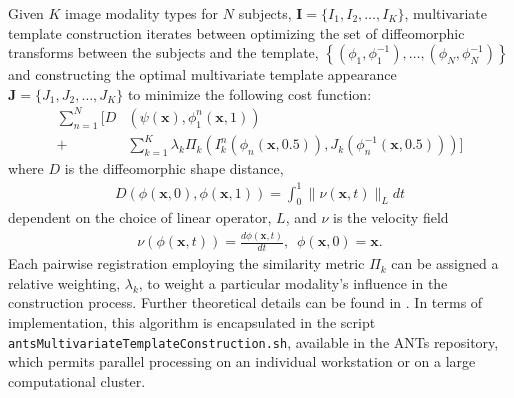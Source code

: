 \documentclass[final,5p,times,twocolumn]{elsarticle}
\begin{document}
Given $K$ image modality types for $N$ subjects,  
${\mathbf I} = \{I_1,I_2,\ldots, I_K\}$, multivariate 
template construction iterates between optimizing the set 
of diffeomorphic transforms between the subjects and the 
template, 
$\left\{\left(\phi_1,\phi_1^{-1}\right),\ldots,\left(\phi_N,\phi_N^{-1}\right)\right\}$ 
and constructing the 
optimal multivariate template appearance 
$\mathbf{J}=\{J_1,J_2,\ldots, J_K\}$ to minimize the
following cost function:
\begin{align}
  \sum_{n=1}^N 
        \Bigg[ D &\left( \psi(\mathbf{x}),\phi_1^n(\mathbf{x},1)\right) \\ \nonumber 
        +& \sum_{k=1}^K \lambda_k \Pi_k \left(I_k^n\left(\phi_n(\mathbf{x},0.5)\right),J_k\left(\phi^{-1}_n(\mathbf{x},0.5)\right)\right)\Bigg]
\end{align}
where $D$ is the diffeomorphic shape distance,
\begin{align}
D\left( \phi( \mathbf{x},0),\phi( \mathbf{x},1)\right) = \int_0^1 \| \nu(\mathbf{x},t)\|_L dt
\end{align}
dependent on the choice of linear operator, $L$, and $\nu$
is the velocity field
\begin{align}
\nu\left( \phi(\mathbf{x},t) \right) = \frac{d\phi(\mathbf{x},t)}{dt},\,\,\, \phi(\mathbf{x},0) = \mathbf{x}.
\end{align}
Each pairwise registration employing the similarity metric $\Pi_k$ can 
be assigned a relative weighting, $\lambda_k$, to weight a particular
modality's influence in the construction process.  Further theoretical
details can be found in \cite{avants2008,avants2010}.
In terms of implementation, this algorithm is 
encapsulated in the script \verb#antsMultivariateTemplateConstruction.sh#,
available in the ANTs repository, which permits parallel processing on
an individual workstation or on a large computational cluster.
\end{document}

